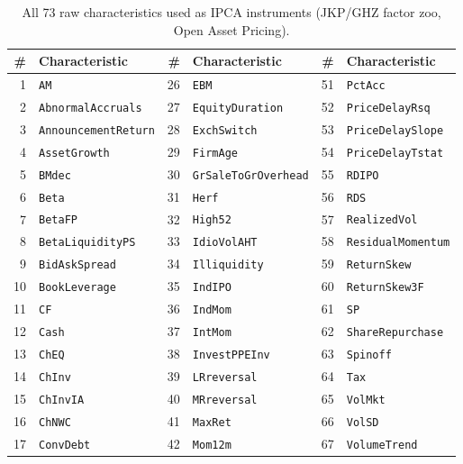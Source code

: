 \begin{table}[htbp]
  \centering
  \small
  \caption{All 73 raw characteristics used as IPCA instruments (JKP/GHZ factor zoo, Open Asset Pricing).}
  \label{tab:characteristics}
  \begin{tabular}{@{} r l | r l | r l @{}}
    \toprule
    \# & Characteristic & \# & Characteristic & \# & Characteristic \\
    \midrule
    1 & \texttt{AM} &     26 & \texttt{EBM} &     51 & \texttt{PctAcc} \\
    2 & \texttt{AbnormalAccruals} &     27 & \texttt{EquityDuration} &     52 & \texttt{PriceDelayRsq} \\
    3 & \texttt{AnnouncementReturn} &     28 & \texttt{ExchSwitch} &     53 & \texttt{PriceDelaySlope} \\
    4 & \texttt{AssetGrowth} &     29 & \texttt{FirmAge} &     54 & \texttt{PriceDelayTstat} \\
    5 & \texttt{BMdec} &     30 & \texttt{GrSaleToGrOverhead} &     55 & \texttt{RDIPO} \\
    6 & \texttt{Beta} &     31 & \texttt{Herf} &     56 & \texttt{RDS} \\
    7 & \texttt{BetaFP} &     32 & \texttt{High52} &     57 & \texttt{RealizedVol} \\
    8 & \texttt{BetaLiquidityPS} &     33 & \texttt{IdioVolAHT} &     58 & \texttt{ResidualMomentum} \\
    9 & \texttt{BidAskSpread} &     34 & \texttt{Illiquidity} &     59 & \texttt{ReturnSkew} \\
    10 & \texttt{BookLeverage} &     35 & \texttt{IndIPO} &     60 & \texttt{ReturnSkew3F} \\
    11 & \texttt{CF} &     36 & \texttt{IndMom} &     61 & \texttt{SP} \\
    12 & \texttt{Cash} &     37 & \texttt{IntMom} &     62 & \texttt{ShareRepurchase} \\
    13 & \texttt{ChEQ} &     38 & \texttt{InvestPPEInv} &     63 & \texttt{Spinoff} \\
    14 & \texttt{ChInv} &     39 & \texttt{LRreversal} &     64 & \texttt{Tax} \\
    15 & \texttt{ChInvIA} &     40 & \texttt{MRreversal} &     65 & \texttt{VolMkt} \\
    16 & \texttt{ChNWC} &     41 & \texttt{MaxRet} &     66 & \texttt{VolSD} \\
    17 & \texttt{ConvDebt} &     42 & \texttt{Mom12m} &     67 & \texttt{VolumeTrend} \\

\end{tabular}
\end{table}
